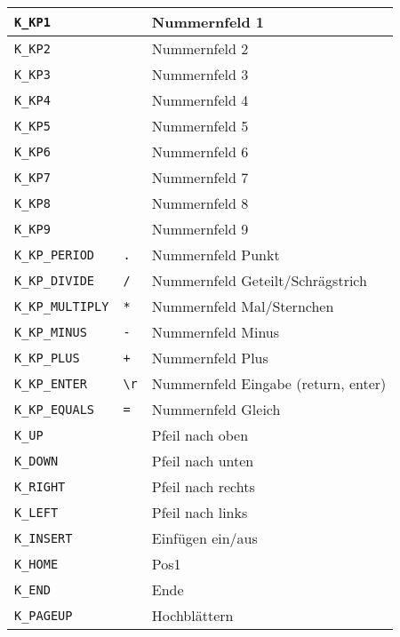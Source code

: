 \begin{longtable}{lll}
\texttt{K\_KP1}          &  \verb+ +     &  Nummernfeld 1\\ \hline
\texttt{K\_KP2}          &  \verb+ +     &  Nummernfeld 2\\ \hline
\texttt{K\_KP3}          &  \verb+ +     &  Nummernfeld 3\\ \hline
\texttt{K\_KP4}          &  \verb+ +     &  Nummernfeld 4\\ \hline
\texttt{K\_KP5}          &  \verb+ +     &  Nummernfeld 5\\ \hline
\texttt{K\_KP6}          &  \verb+ +     &  Nummernfeld 6\\ \hline
\texttt{K\_KP7}          &  \verb+ +     &  Nummernfeld 7\\ \hline
\texttt{K\_KP8}          &  \verb+ +     &  Nummernfeld 8\\ \hline
\texttt{K\_KP9}          &  \verb+ +     &  Nummernfeld 9\\ \hline
\texttt{K\_KP\_PERIOD}   &  \verb+.+     &  Nummernfeld Punkt\\ \hline
\texttt{K\_KP\_DIVIDE}   &  \verb+/+     &  Nummernfeld Geteilt/Schrägstrich\\ \hline
\texttt{K\_KP\_MULTIPLY} &  \verb+*+     &  Nummernfeld Mal/Sternchen\\ \hline
\texttt{K\_KP\_MINUS}    &  \verb+-+     &  Nummernfeld Minus\\ \hline
\texttt{K\_KP\_PLUS}     &  \verb-+-     &  Nummernfeld Plus\\ \hline
\texttt{K\_KP\_ENTER}    &  \verb+\r+    &  Nummernfeld Eingabe (return, enter)\\ \hline
\texttt{K\_KP\_EQUALS}   &  \verb+=+     &  Nummernfeld Gleich\\ \hline
\texttt{K\_UP}           &  \verb+ +     &  Pfeil nach oben\\ \hline
\texttt{K\_DOWN}         &  \verb+ +     &  Pfeil nach unten\\ \hline
\texttt{K\_RIGHT}        &  \verb+ +     &  Pfeil nach rechts\\ \hline
\texttt{K\_LEFT}         &  \verb+ +     &  Pfeil nach links\\ \hline
\texttt{K\_INSERT}       &  \verb+ +     &  Einfügen ein/aus\\ \hline
\texttt{K\_HOME}         &  \verb+ +     &  Pos1\\ \hline
\texttt{K\_END}          &  \verb+ +     &  Ende\\ \hline
\texttt{K\_PAGEUP}       &  \verb+ +     &  Hochblättern\\ \hline

\end{longtable}
